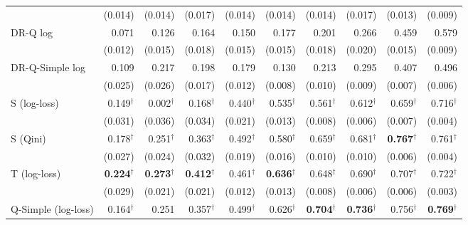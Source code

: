 \documentclass{article}
\begin{document}
\begin{table}[H]
\begin{tabular}{l|rrrrrrrrr}
 & \scriptsize (0.014) & \scriptsize (0.014) & \scriptsize (0.017) & \scriptsize (0.014) & \scriptsize (0.014) & \scriptsize (0.014) & \scriptsize (0.017) & \scriptsize (0.013) & \scriptsize (0.009) \\[2pt]
DR-Q log & 0.071 & 0.126 & 0.164 & 0.150 & 0.177 & 0.201 & 0.266 & 0.459 & 0.579 \\
 & \scriptsize (0.012) & \scriptsize (0.015) & \scriptsize (0.018) & \scriptsize (0.015) & \scriptsize (0.015) & \scriptsize (0.018) & \scriptsize (0.020) & \scriptsize (0.015) & \scriptsize (0.009) \\[2pt]
DR-Q-Simple log & 0.109 & 0.217 & 0.198 & 0.179 & 0.130 & 0.213 & 0.295 & 0.407 & 0.496 \\
 & \scriptsize (0.025) & \scriptsize (0.026) & \scriptsize (0.017) & \scriptsize (0.012) & \scriptsize (0.008) & \scriptsize (0.010) & \scriptsize (0.009) & \scriptsize (0.007) & \scriptsize (0.006) \\[2pt]
\hline
S (log-loss) & 0.149$^\dagger$ & 0.002$^\dagger$ & 0.168$^\dagger$ & 0.440$^\dagger$ & 0.535$^\dagger$ & 0.561$^\dagger$ & 0.612$^\dagger$ & 0.659$^\dagger$ & 0.716$^\dagger$ \\
 & \scriptsize (0.031) & \scriptsize (0.036) & \scriptsize (0.034) & \scriptsize (0.021) & \scriptsize (0.013) & \scriptsize (0.008) & \scriptsize (0.006) & \scriptsize (0.007) & \scriptsize (0.004) \\[2pt]
S (Qini) & 0.178$^\dagger$ & 0.251$^\dagger$ & 0.363$^\dagger$ & 0.492$^\dagger$ & 0.580$^\dagger$ & 0.659$^\dagger$ & 0.681$^\dagger$ & \textbf{0.767}$^\dagger$ & 0.761$^\dagger$ \\
 & \scriptsize (0.027) & \scriptsize (0.024) & \scriptsize (0.032) & \scriptsize (0.019) & \scriptsize (0.016) & \scriptsize (0.010) & \scriptsize (0.010) & \scriptsize (0.006) & \scriptsize (0.004) \\[2pt]
T (log-loss) & \textbf{0.224}$^\dagger$ & \textbf{0.273}$^\dagger$ & \textbf{0.412}$^\dagger$ & 0.461$^\dagger$ & \textbf{0.636}$^\dagger$ & 0.648$^\dagger$ & 0.690$^\dagger$ & 0.707$^\dagger$ & 0.722$^\dagger$ \\
 & \scriptsize (0.029) & \scriptsize (0.021) & \scriptsize (0.021) & \scriptsize (0.012) & \scriptsize (0.013) & \scriptsize (0.008) & \scriptsize (0.006) & \scriptsize (0.006) & \scriptsize (0.003) \\[2pt]
Q-Simple (log-loss) & 0.164$^\dagger$ & 0.251 & 0.357$^\dagger$ & 0.499$^\dagger$ & 0.626$^\dagger$ & \textbf{0.704}$^\dagger$ & \textbf{0.736}$^\dagger$ & 0.756$^\dagger$ & \textbf{0.769}$^\dagger$ \\

\end{tabular}
\end{table}
\end{document}
